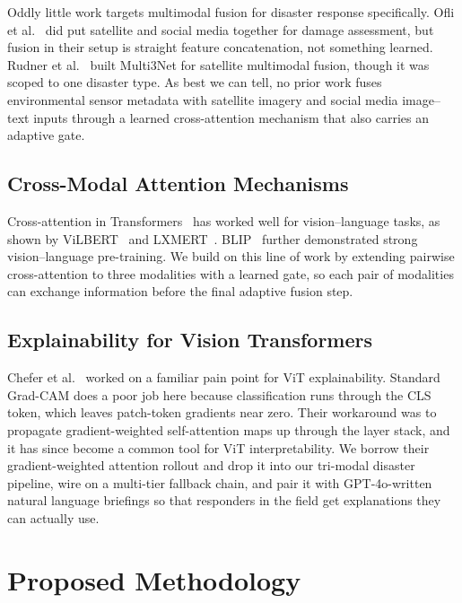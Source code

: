 \documentclass[journal]{IEEEtran}
\begin{document}
Oddly little work targets multimodal fusion for disaster response specifically. Ofli et al.~\cite{ofli2020analysis} did put satellite and social media together for damage assessment, but fusion in their setup is straight feature concatenation, not something learned. Rudner et al.~\cite{rudner2019multi3net} built Multi3Net for satellite multimodal fusion, though it was scoped to one disaster type. As best we can tell, no prior work fuses environmental sensor metadata with satellite imagery and social media image--text inputs through a learned cross-attention mechanism that also carries an adaptive gate.

\subsection{Cross-Modal Attention Mechanisms}

Cross-attention in Transformers~\cite{vaswani2017attention} has worked well for vision--language tasks, as shown by ViLBERT~\cite{lu2019vilbert} and LXMERT~\cite{tan2019lxmert}. BLIP~\cite{li2022blip} further demonstrated strong vision--language pre-training. We build on this line of work by extending pairwise cross-attention to three modalities with a learned gate, so each pair of modalities can exchange information before the final adaptive fusion step.

\subsection{Explainability for Vision Transformers}

Chefer et al.~\cite{chefer2021transformer} worked on a familiar pain point for ViT explainability. Standard Grad-CAM does a poor job here because classification runs through the CLS token, which leaves patch-token gradients near zero. Their workaround was to propagate gradient-weighted self-attention maps up through the layer stack, and it has since become a common tool for ViT interpretability. We borrow their gradient-weighted attention rollout and drop it into our tri-modal disaster pipeline, wire on a multi-tier fallback chain, and pair it with GPT-4o-written natural language briefings so that responders in the field get explanations they can actually use.

\section{Proposed Methodology}
\end{document}

